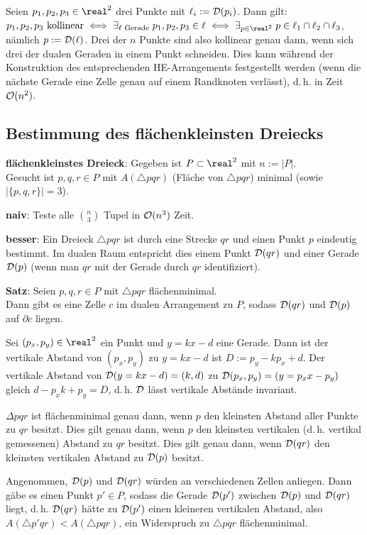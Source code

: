 Seien $p_1, p_2, p_3 \in \real^2$ drei Punkte mit $\ell_i := \mathcal{D}(p_i)$.
Dann gilt:\\
$p_1, p_2, p_3 \text{ kollinear} \iff
\exists_{\ell \text{ Gerade}}\; p_1, p_2, p_3 \in \ell \iff
\exists_{p \in \real^2}\; p \in \ell_1 \cap \ell_2 \cap \ell_3$,
nämlich $p := \mathcal{D}(\ell)$.
Drei der $n$ Punkte sind also kollinear genau dann, wenn sich drei der dualen Geraden in einem
Punkt schneiden.
Dies kann während der Konstruktion des entsprechenden HE-Arrangements festgestellt werden
(wenn die nächste Gerade eine Zelle genau auf einem Randknoten verlässt),
d.\,h. in Zeit $\mathcal{O}(n^2)$.

\pagebreak

\subsection{%
    Bestimmung des flächenkleinsten Dreiecks%
}

\textbf{flächenkleinstes Dreieck}:
Gegeben ist $P \subset \real^2$ mit $n := |P|$.\\
Gesucht ist $p, q, r \in P$ mit $A(\triangle pqr)$ (Fläche von $\triangle pqr$) minimal
(sowie $|\{p, q, r\}| = 3$).

\textbf{naiv}:
Teste alle $\binom{n}{3}$ Tupel in $\mathcal{O}(n^3)$ Zeit.

\linie

\textbf{besser}:
Ein Dreieck $\triangle pqr$ ist durch eine Strecke $qr$ und einen Punkt $p$ eindeutig bestimmt.
Im dualen Raum entspricht dies einem Punkt $\mathcal{D}(qr)$ und einer Gerade $\mathcal{D}(p)$
(wenn man $qr$ mit der Gerade durch $qr$ identifiziert).

\textbf{Satz}:
Seien $p, q, r \in P$ mit $\triangle pqr$ flächenminimal.\\
Dann gibt es eine Zelle $c$ im dualen Arrangement zu $P$, sodass
$\mathcal{D}(qr)$ und $\mathcal{D}(p)$ auf $\partial c$ liegen.

\begin{Beweis}
    Sei $(p_x, p_y) \in \real^2$ ein Punkt und $y = kx - d$ eine Gerade.
    Dann ist der vertikale Abstand von $(p_x, p_y)$ zu $y = kx - d$ ist $D := p_y - kp_x + d$.
    Der vertikale Abstand von $\mathcal{D}(y = kx - d) = (k, d)$ zu $\mathcal{D}(p_x, p_y) = (y = p_x x - p_y)$
    gleich $d - p_x k + p_y = D$, d.\,h. $\mathcal{D}$ lässt vertikale Abstände invariant.

    $\Delta pqr$ ist flächenminimal genau dann, wenn $p$ den kleinsten Abstand aller Punkte zu
    $qr$ besitzt.
    Dies gilt genau dann, wenn $p$ den kleinsten vertikalen (d.\,h. vertikal gemessenen) Abstand
    zu $qr$ besitzt.
    Dies gilt genau dann, wenn $\mathcal{D}(qr)$ den kleinsten vertikalen Abstand zu $\mathcal{D}(p)$ besitzt.

    Angenommen, $\mathcal{D}(p)$ und $\mathcal{D}(qr)$ würden an verschiedenen Zellen anliegen.
    Dann gäbe es einen Punkt $p' \in P$, sodass die Gerade $\mathcal{D}(p')$ zwischen $\mathcal{D}(p)$ und $\mathcal{D}(qr)$
    liegt, d.\,h. $\mathcal{D}(qr)$ hätte zu $\mathcal{D}(p')$ einen kleineren vertikalen Abstand,
    also $A(\triangle p'qr) < A(\triangle pqr)$, ein Widerspruch zu $\triangle pqr$ flächenminimal.
\end{Beweis}

